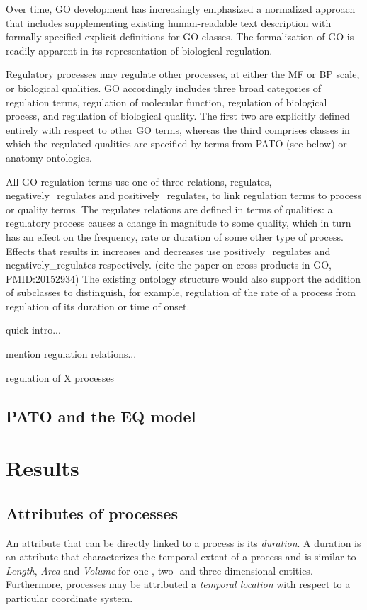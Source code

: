 \documentclass{bioinfo}
\renewcommand{\cite}{\citep}
\begin{document}
Over time, GO development has increasingly emphasized a normalized
approach that includes supplementing existing human-readable text
description with formally specified explicit definitions for GO
classes. The formalization of GO is readily apparent in its
representation of biological regulation.

Regulatory processes may regulate other processes, at either the MF or
BP scale, or biological qualities. GO accordingly includes three broad
categories of regulation terms, regulation of molecular function,
regulation of biological process, and regulation of biological
quality. The first two are explicitly defined entirely with respect to
other GO terms, whereas the third comprises classes in which the
regulated qualities are specified by terms from PATO (see below) or
anatomy ontologies.

All GO regulation terms use one of three relations, regulates,
negatively_regulates and positively_regulates, to link regulation
terms to process or quality terms. The regulates relations are defined
in terms of qualities: a regulatory process causes a change in
magnitude to some quality, which in turn has an effect on the
frequency, rate or duration of some other type of process. Effects
that results in increases and decreases use positively_regulates and
negatively_regulates respectively. \cite{} (cite the paper on
cross-products in GO, PMID:20152934) The existing ontology structure
would also support the addition of subclasses to distinguish, for
example, regulation of the rate of a process from regulation of its
duration or time of onset.

quick intro...

mention regulation relations... 

regulation of X processes

\subsection{PATO and the EQ model}

\section{Results}
\subsection{Attributes of processes}
An attribute that can be directly linked to a process is its {\em
  duration}. A duration is an attribute that characterizes the
temporal extent of a process and is similar to {\em Length}, {\em
  Area} and {\em Volume} for one-, two- and three-dimensional
entities. Furthermore, processes may be attributed a {\em temporal
  location} with respect to a particular coordinate system.
\end{document}

